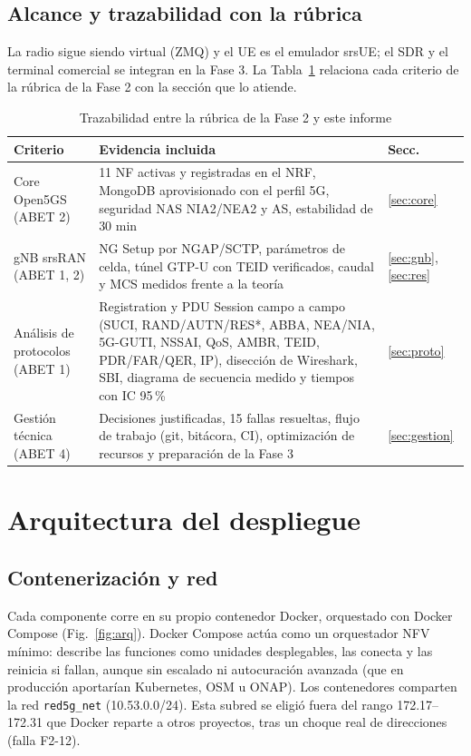 \documentclass[conference]{IEEEtran}
\begin{document}
\subsection{Alcance y trazabilidad con la rúbrica}
La radio sigue siendo virtual (ZMQ) y el UE es el emulador srsUE; el SDR y el terminal comercial se integran en la Fase 3. La Tabla~\ref{tab:trazabilidad} relaciona cada criterio de la rúbrica de la Fase 2 con la sección que lo atiende.

\begin{table}[!t]
\caption{Trazabilidad entre la rúbrica de la Fase 2 y este informe}
\label{tab:trazabilidad}
\centering
\footnotesize
\renewcommand{\arraystretch}{1.15}
\begin{tabular}{p{2.3cm}p{4.9cm}p{0.8cm}}
\toprule
\textbf{Criterio} & \textbf{Evidencia incluida} & \textbf{Secc.} \\
\midrule
Core Open5GS (ABET 2) & 11 NF activas y registradas en el NRF, MongoDB aprovisionado con el perfil 5G, seguridad NAS NIA2/NEA2 y AS, estabilidad de 30 min & \ref{sec:core} \\
gNB srsRAN (ABET 1, 2) & NG Setup por NGAP/SCTP, parámetros de celda, túnel GTP-U con TEID verificados, caudal y MCS medidos frente a la teoría & \ref{sec:gnb}, \ref{sec:res} \\
Análisis de protocolos (ABET 1) & Registration y PDU Session campo a campo (SUCI, RAND/AUTN/RES*, ABBA, NEA/NIA, 5G-GUTI, NSSAI, QoS, AMBR, TEID, PDR/FAR/QER, IP), disección de Wireshark, SBI, diagrama de secuencia medido y tiempos con IC 95\,\% & \ref{sec:proto} \\
Gestión técnica (ABET 4) & Decisiones justificadas, 15 fallas resueltas, flujo de trabajo (git, bitácora, CI), optimización de recursos y preparación de la Fase 3 & \ref{sec:gestion} \\
\bottomrule
\end{tabular}
\end{table}

\section{Arquitectura del despliegue}
\label{sec:arq}

\subsection{Contenerización y red}
Cada componente corre en su propio contenedor Docker, orquestado con Docker Compose \cite{docker} (Fig.~\ref{fig:arq}). Docker Compose actúa como un orquestador NFV mínimo: describe las funciones como unidades desplegables, las conecta y las reinicia si fallan, aunque sin escalado ni autocuración avanzada (que en producción aportarían Kubernetes, OSM u ONAP). Los contenedores comparten la red \texttt{red5g\_net} (10.53.0.0/24). Esta subred se eligió fuera del rango 172.17--172.31 que Docker reparte a otros proyectos, tras un choque real de direcciones (falla F2-12).
\end{document}
